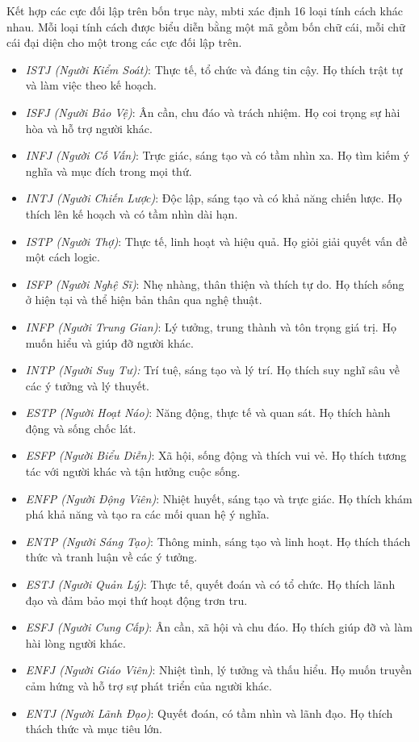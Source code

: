 Kết hợp các cực đối lập trên bốn trục này, \acrshort{mbti} xác định 16 loại tính cách khác nhau. Mỗi loại tính cách được biểu diễn bằng một mã gồm bốn chữ cái, mỗi chữ cái đại diện cho một trong các cực đối lập trên. 
\begin{itemize}
    \item \textit{ISTJ (Người Kiểm Soát)}: Thực tế, tổ chức và đáng tin cậy. Họ thích trật tự và làm việc theo kế hoạch.
    \item \textit{ISFJ (Người Bảo Vệ)}:  Ân cần, chu đáo và trách nhiệm. Họ coi trọng sự hài hòa và hỗ trợ người khác.
    \item \textit{INFJ (Người Cố Vấn)}: Trực giác, sáng tạo và có tầm nhìn xa. Họ tìm kiếm ý nghĩa và mục đích trong mọi thứ.
    \item \textit{INTJ (Người Chiến Lược)}: Độc lập, sáng tạo và có khả năng chiến lược. Họ thích lên kế hoạch và có tầm nhìn dài hạn.
    \item \textit{ISTP (Người Thợ)}: Thực tế, linh hoạt và hiệu quả. Họ giỏi giải quyết vấn đề một cách logic.
    \item \textit{ISFP (Người Nghệ Sĩ)}: Nhẹ nhàng, thân thiện và thích tự do. Họ thích sống ở hiện tại và thể hiện bản thân qua nghệ thuật.
    \item \textit{INFP (Người Trung Gian)}: Lý tưởng, trung thành và tôn trọng giá trị. Họ muốn hiểu và giúp đỡ người khác.
    \item \textit{INTP (Người Suy Tư):} Trí tuệ, sáng tạo và lý trí. Họ thích suy nghĩ sâu về các ý tưởng và lý thuyết.
    \item \textit{ESTP (Người Hoạt Náo)}: Năng động, thực tế và quan sát. Họ thích hành động và sống chốc lát.
    \item \textit{ESFP (Người Biểu Diễn)}: Xã hội, sống động và thích vui vẻ. Họ thích tương tác với người khác và tận hưởng cuộc sống.
    \item \textit{ENFP (Người Động Viên)}: Nhiệt huyết, sáng tạo và trực giác. Họ thích khám phá khả năng và tạo ra các mối quan hệ ý nghĩa.
    \item \textit{ENTP (Người Sáng Tạo)}: Thông minh, sáng tạo và linh hoạt. Họ thích thách thức và tranh luận về các ý tưởng.
    \item \textit{ESTJ (Người Quản Lý)}: Thực tế, quyết đoán và có tổ chức. Họ thích lãnh đạo và đảm bảo mọi thứ hoạt động trơn tru.
    \item \textit{ESFJ (Người Cung Cấp)}:  Ân cần, xã hội và chu đáo. Họ thích giúp đỡ và làm hài lòng người khác.
    \item \textit{ENFJ (Người Giáo Viên)}: Nhiệt tình, lý tưởng và thấu hiểu. Họ muốn truyền cảm hứng và hỗ trợ sự phát triển của người khác.
    \item \textit{ENTJ (Người Lãnh Đạo)}: Quyết đoán, có tầm nhìn và lãnh đạo. Họ thích thách thức và mục tiêu lớn.
\end{itemize}

